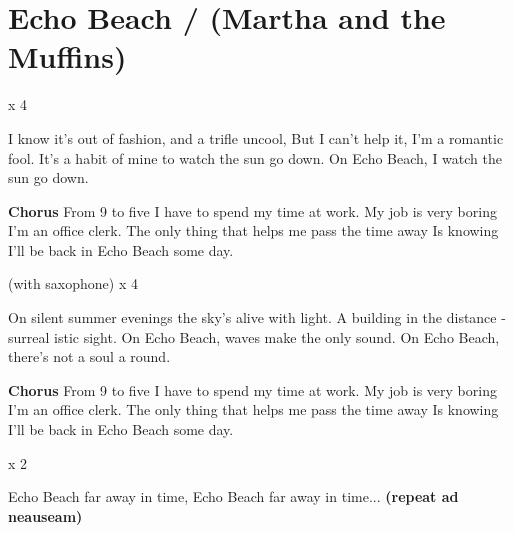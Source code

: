 \section{Echo Beach / (Martha and the Muffins)}\label{sec:echo_beach}
x 4

I know it's out of fashion, and a trifle 
uncool, 
But I can't help it, I'm a romantic fool.
It's a habit of mine to watch the sun go 
down. 
On Echo Beach, I watch the sun go down.

\textbf{Chorus}
From 9 to five I have to spend my time at work.
My job is very boring I'm an office clerk.
The only thing that helps me pass the time away
Is knowing I'll be back in Echo Beach some day.

(with saxophone)
x 4

On silent summer evenings the sky's alive with
light. 
A building in the distance - surreal istic 
sight. 
On Echo Beach, waves make the only sound.
On Echo Beach, there's not a soul a round.

\textbf{Chorus}
From 9 to five I have to spend my time at work.
My job is very boring I'm an office clerk.
The only thing that helps me pass the time away
Is knowing I'll be back in Echo Beach some day.

x 2

Echo Beach far away in time, Echo Beach 
far away in time...
\textbf{(repeat ad neauseam)}
